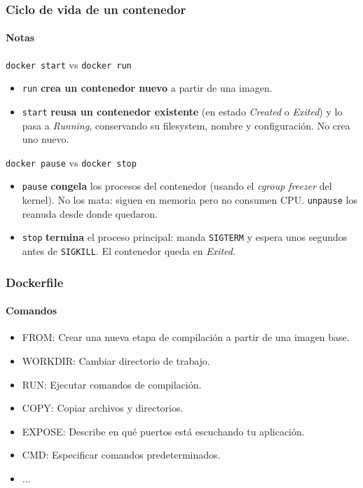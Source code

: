 \begin{frame}
    \frametitle{Ciclo de vida de un contenedor}
    \framesubtitle{Notas}

    \begin{block}{\texttt{docker start} vs \texttt{docker run}}
        \begin{itemize}
            \item \texttt{run} \textbf{crea un contenedor nuevo} a partir de una imagen.
            \item \texttt{start} \textbf{reusa un contenedor existente} (en estado \textit{Created} o \textit{Exited}) y lo pasa a \textit{Running}, conservando su filesystem, nombre y configuración. No crea uno nuevo.
        \end{itemize}
    \end{block}

    \begin{block}{\texttt{docker pause} vs \texttt{docker stop}}
        \begin{itemize}
            \item \texttt{pause} \textbf{congela} los procesos del contenedor (usando el \textit{cgroup freezer} del kernel). No los mata: siguen en memoria pero no consumen CPU. \texttt{unpause} los reanuda desde donde quedaron.
            \item \texttt{stop} \textbf{termina} el proceso principal: manda \texttt{SIGTERM} y espera unos segundos antes de \texttt{SIGKILL}. El contenedor queda en \textit{Exited}.
        \end{itemize}
    \end{block}
\end{frame}





\begin{frame}
    \frametitle{Dockerfile}
    \framesubtitle{Comandos}
        \begin{block}{}
        \begin{itemize}
            \item FROM: Crear una nueva etapa de compilación a partir de una imagen base.
            \item WORKDIR: Cambiar directorio de trabajo.
            \item RUN: Ejecutar comandos de compilación.
            \item COPY: Copiar archivos y directorios.
            \item EXPOSE: Describe en qué puertos está escuchando tu aplicación.
            \item CMD: Especificar comandos predeterminados.
            \item ...
        \end{itemize}
        \end{block}
    \end{frame}

